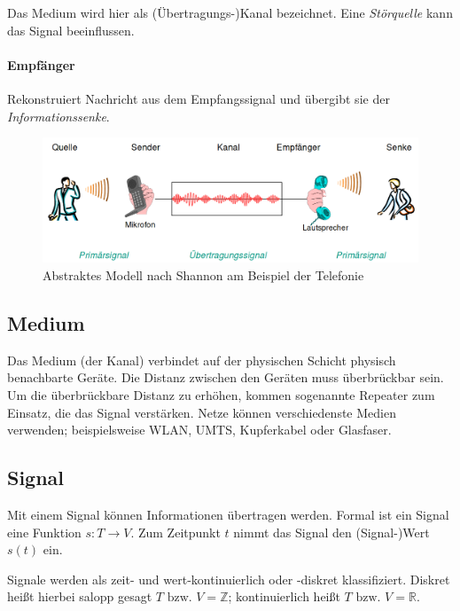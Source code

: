 \documentclass[a4paper, 14pt]{article}
\begin{document}
	Das Medium wird hier als (Übertragungs-)Kanal bezeichnet.
	Eine \emph{Störquelle} kann das Signal beeinflussen.

	\paragraph{Empfänger}

	Rekonstruiert Nachricht aus dem Empfangssignal und übergibt sie der \emph{Informationssenke}.

	\begin{figure}
		\includegraphics[width=\textwidth]{images/03-shannon-telephone.png}
		\caption{Abstraktes Modell nach Shannon am Beispiel der Telefonie}
	\end{figure}

	\subsection{Medium}

	Das Medium (der Kanal) verbindet auf der physischen Schicht physisch benachbarte Geräte.
	Die Distanz zwischen den Geräten muss überbrückbar sein.
	Um die überbrückbare Distanz zu erhöhen, kommen sogenannte Repeater zum Einsatz, die das Signal verstärken.
	Netze können verschiedenste Medien verwenden; beispielsweise WLAN, UMTS, Kupferkabel oder Glasfaser.

	\subsection{Signal}

	Mit einem Signal können Informationen übertragen werden.
	Formal ist ein Signal eine Funktion $s : T \to V$.
	Zum Zeitpunkt $t$ nimmt das Signal den (Signal-)Wert $s(t)$ ein.

	Signale werden als zeit- und wert-kontinuierlich oder -diskret klassifiziert.
	Diskret heißt hierbei salopp gesagt $T\text{ bzw. }V = \mathbb{Z}$; kontinuierlich heißt $T\text{ bzw. }V = \mathbb{R}$.
\end{document}
